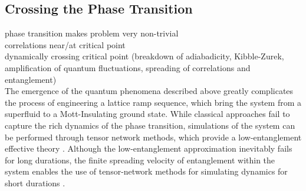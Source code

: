 \subsection{Crossing the Phase Transition}

phase transition makes problem very non-trivial\\
correlations near/at critical point \\
dynamically crossing critical point (breakdown of adiabadicity, Kibble-Zurek, amplification of quantum fluctuations, spreading of correlations and entanglement) \\


The emergence of the quantum phenomena described above greatly complicates the process of engineering a lattice ramp sequence, which bring the system from a superfluid to a Mott-Insulating ground state. While classical approaches fail to capture the rich dynamics of the phase transition, simulations of the system can be performed through tensor network methods, which provide a low-entanglement effective theory \cite{Gillman2018}. Although the low-entanglement approximation inevitably fails for long durations, the finite spreading velocity of entanglement within the system enables the use of tensor-network methods for simulating dynamics for short durations \cite{Eisert2015}. 